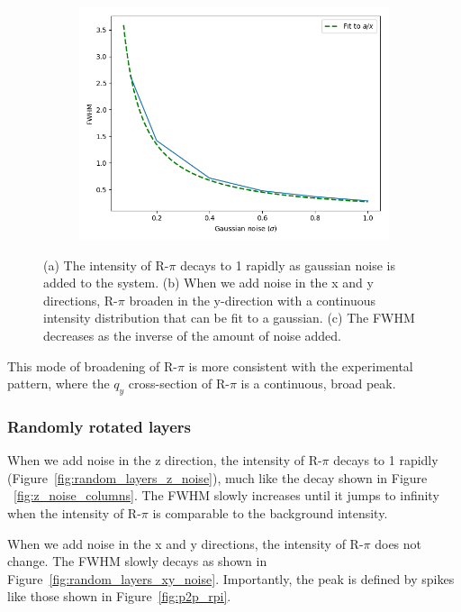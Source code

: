 \documentclass{article}
\begin{document}
\begin{figure}[!htb]
\begin{subfigure}{0.32\textwidth}
  \includegraphics[width=\textwidth]{random_columns_xy_noise.png}
  \caption{}\label{fig:FWHM_columns}
  \end{subfigure}
  \caption{(a) The intensity of R-$\pi$ decays to 1 rapidly as gaussian noise is 
   added to the system. (b) When we add noise in the x and y directions, R-$\pi$
   broaden in the y-direction with a continuous intensity distribution that can be
   fit to a gaussian. (c) The FWHM decreases as the inverse of the amount of 
   noise added.}\label{fig:columns_noise}
  \end{figure}

  This mode of broadening of R-$\pi$ is more consistent with the experimental
  pattern, where the $q_y$ cross-section of R-$\pi$ is a continuous, broad peak. 

  \subsubsection{Randomly rotated layers}

  When we add noise in the z direction, the intensity of R-$\pi$ decays to 1
  rapidly (Figure~\ref{fig:random_layers_z_noise}), much like the decay shown in
  Figure ~\ref{fig:z_noise_columns}. The FWHM slowly increases until it jumps to
  infinity when the intensity of R-$\pi$ is comparable to the background
  intensity.

  When we add noise in the x and y directions, the intensity of R-$\pi$ does
  not change. The FWHM slowly decays as shown in
  Figure~\ref{fig:random_layers_xy_noise}. Importantly, the peak is defined by
  spikes like those shown in Figure~\ref{fig:p2p_rpi}.
\end{document}
